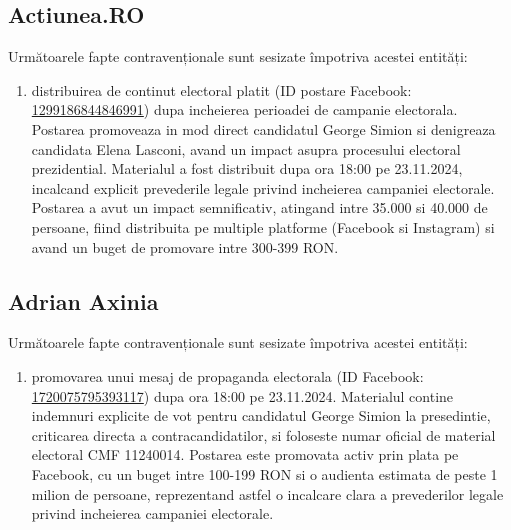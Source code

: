 \documentclass[a4paper,12pt]{article}
\begin{document}
\vspace{0.5cm}

\subsection{Actiunea.RO}
Următoarele fapte contravenționale sunt sesizate împotriva acestei entități:

\begin{enumerate}[leftmargin=*, label=\arabic*.)]
    \item distribuirea de continut electoral platit (ID postare Facebook: \href{https://www.facebook.com/ads/library/?id=1299186844846991}{1299186844846991}) dupa incheierea perioadei de campanie electorala. Postarea promoveaza in mod direct candidatul George Simion si denigreaza candidata Elena Lasconi, avand un impact asupra procesului electoral prezidential. Materialul a fost distribuit dupa ora 18:00 pe 23.11.2024, incalcand explicit prevederile legale privind incheierea campaniei electorale. Postarea a avut un impact semnificativ, atingand intre 35.000 si 40.000 de persoane, fiind distribuita pe multiple platforme (Facebook si Instagram) si avand un buget de promovare intre 300-399 RON.
\end{enumerate}

\vspace{0.5cm}

\subsection{Adrian Axinia}
Următoarele fapte contravenționale sunt sesizate împotriva acestei entități:

\begin{enumerate}[leftmargin=*, label=\arabic*.)]
    \item promovarea unui mesaj de propaganda electorala (ID Facebook: \href{https://www.facebook.com/ads/library/?id=1720075795393117}{1720075795393117}) dupa ora 18:00 pe 23.11.2024. Materialul contine indemnuri explicite de vot pentru candidatul George Simion la presedintie, criticarea directa a contracandidatilor, si foloseste numar oficial de material electoral CMF 11240014. Postarea este promovata activ prin plata pe Facebook, cu un buget intre 100-199 RON si o audienta estimata de peste 1 milion de persoane, reprezentand astfel o incalcare clara a prevederilor legale privind incheierea campaniei electorale.
\end{enumerate}

\vspace{0.5cm}
\end{document}
